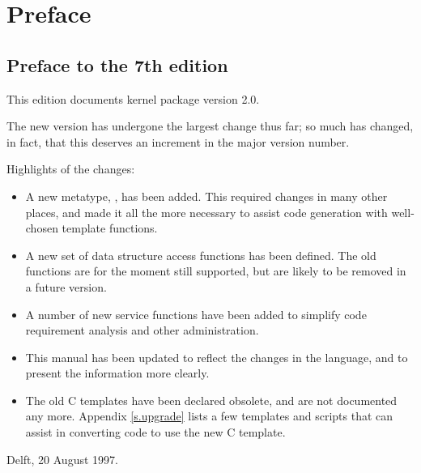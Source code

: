 \chapter{Preface}
\label{s.preface}
\section{Preface to the 7th edition}
This edition documents {\Tm} kernel package version 2.0.
\par
The new version has undergone the largest change thus far; so much
has changed, in fact, that this deserves an increment in the major
version number.
\par
Highlights of the changes:
\begin{itemize}
\item A new metatype, , has been added. This required
changes in many other places, and made it all the more necessary
to assist code generation with well-chosen template functions.
\item A new set of data structure access functions has been defined.
The old functions are for the moment still supported, but are likely
to be removed in a future version.
\item A number of new service functions have been added to simplify
code requirement analysis and other administration.
\item This manual has been updated to reflect the changes in the
language, and to present the information more clearly.
\item The old C templates have been declared obsolete, and are
not documented any more. Appendix \ref{s.upgrade} lists a few templates and
scripts that can assist in converting code to use the new C template.
\end{itemize}
\begin{flushright}
Delft, 20 August 1997.
\end{flushright}
